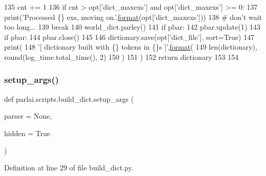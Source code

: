 \begin{DoxyCode}
135             cnt += 1
136             \textcolor{keywordflow}{if} cnt > opt[\textcolor{stringliteral}{'dict\_maxexs'}] \textcolor{keywordflow}{and} opt[\textcolor{stringliteral}{'dict\_maxexs'}] >= 0:
137                 print(\textcolor{stringliteral}{'Processed \{\} exs, moving on.'}.\hyperlink{namespaceparlai_1_1chat__service_1_1services_1_1messenger_1_1shared__utils_a32e2e2022b824fbaf80c747160b52a76}{format}(opt[\textcolor{stringliteral}{'dict\_maxexs'}]))
138                 \textcolor{comment}{# don't wait too long...}
139                 \textcolor{keywordflow}{break}
140             world\_dict.parley()
141             \textcolor{keywordflow}{if} pbar:
142                 pbar.update(1)
143         \textcolor{keywordflow}{if} pbar:
144             pbar.close()
145 
146     dictionary.save(opt[\textcolor{stringliteral}{'dict\_file'}], sort=\textcolor{keyword}{True})
147     print(
148         \textcolor{stringliteral}{'[ dictionary built with \{\} tokens in \{\}s ]'}.\hyperlink{namespaceparlai_1_1chat__service_1_1services_1_1messenger_1_1shared__utils_a32e2e2022b824fbaf80c747160b52a76}{format}(
149             len(dictionary), round(log\_time.total\_time(), 2)
150         )
151     )
152     \textcolor{keywordflow}{return} dictionary
153 
154 
\end{DoxyCode}
\mbox{\label{namespaceparlai_1_1scripts_1_1build__dict_a01e78707ace903aa772ada53fafe7067}} 
\subsubsection{\texorpdfstring{setup\+\_\+args()}{setup\_args()}}
{\footnotesize\ttfamily def parlai.\+scripts.\+build\+\_\+dict.\+setup\+\_\+args (\begin{DoxyParamCaption}\item[{}]{parser = {\ttfamily None},  }\item[{}]{hidden = {\ttfamily True} }\end{DoxyParamCaption})}



Definition at line 29 of file build\+\_\+dict.\+py.


